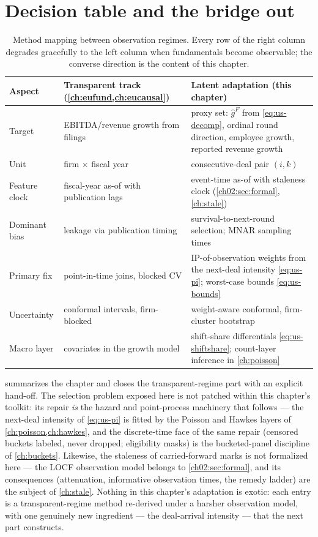 \section{Decision table and the bridge out}\label{chpx:sec:decision}

\begin{table}[htbp]
\centering
\small
\begin{tabular}{p{2.5cm}p{4.6cm}p{5.6cm}}
\toprule
Aspect & Transparent track (\cref{ch:eufund,ch:eucausal}) & Latent
adaptation (this chapter) \\
\midrule
Target & EBITDA/revenue growth from filings & proxy set: $\hat{g}^{F}$
from \cref{eq:us-decomp}, ordinal round direction, employee growth,
reported revenue growth \\
Unit & firm $\times$ fiscal year & consecutive-deal pair $(i,k)$ \\
Feature clock & fiscal-year as-of with publication lags & event-time
as-of with staleness clock (\cref{ch02:sec:formal}, \cref{ch:stale}) \\
Dominant bias & leakage via publication timing & survival-to-next-round
selection; MNAR sampling times \\
Primary fix & point-in-time joins, blocked CV & IP-of-observation
weights from the next-deal intensity \cref{eq:us-pi}; worst-case bounds
\cref{eq:us-bounds} \\
Uncertainty & conformal intervals, firm-blocked & weight-aware
conformal, firm-cluster bootstrap \\
Macro layer & covariates in the growth model & shift-share
differentials \cref{eq:us-shiftshare}; count-layer inference in
\cref{ch:poisson} \\
\bottomrule
\end{tabular}
\caption{Method mapping between observation regimes. Every row of the
right column degrades gracefully to the left column when fundamentals
become observable; the converse direction is the content of this
chapter.}
\label{chpx:tab:decision}
\end{table}

 summarizes the chapter and closes the transparent-regime part with an
explicit hand-off. The selection problem exposed here is not patched within this chapter's
toolkit: its repair \emph{is} the hazard and point-process machinery that follows --- the
next-deal intensity of \cref{eq:us-pi} is fitted by the Poisson and Hawkes layers of
\cref{ch:poisson,ch:hawkes}, and the discrete-time face of the same repair (censored buckets
labeled, never dropped; eligibility masks) is the bucketed-panel discipline of
\cref{ch:buckets}. Likewise, the staleness of carried-forward marks is not formalized here ---
the LOCF observation model belongs to \cref{ch02:sec:formal}, and its consequences
(attenuation, informative observation times, the remedy ladder) are the subject of
\cref{ch:stale}. Nothing in this chapter's adaptation is exotic: each entry is a
transparent-regime method re-derived under a harsher observation model, with one genuinely new
ingredient --- the deal-arrival intensity --- that the next part constructs.

